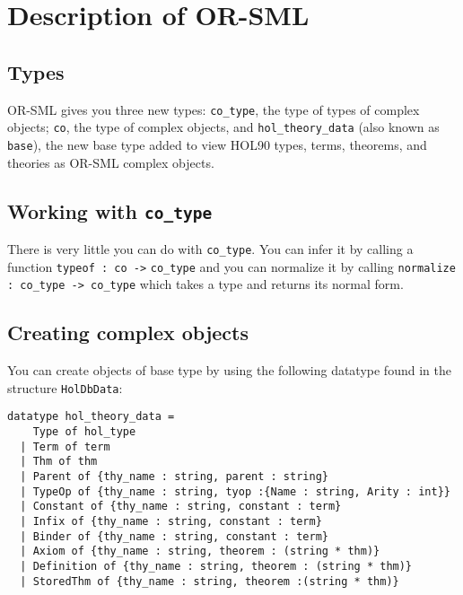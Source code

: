 \section{Description of OR-SML}

\subsection{Types}
OR-SML gives you three new types: {\tt co\_type}, the type of types of
complex objects; {\tt co}, the type of complex objects, and
{\tt hol\_theory\_data} (also known as {\tt base}), the 
new base type added to view HOL90 types, terms, theorems, and theories
as OR-SML complex objects.


\subsection{Working with {\tt co\_type}}

There is very little you can do with {\tt co\_type}. You can infer it by
calling a function {\tt typeof : co ->} {\tt co\_type}
and you can
normalize it by calling {\tt normalize : co\_type -> co\_type} which
takes a type and returns its normal form.



\subsection{Creating complex objects}

You can create objects of base type by using the following datatype
found in the structure {\tt HolDbData}:
\begin{verbatim}
datatype hol_theory_data =
    Type of hol_type
  | Term of term
  | Thm of thm
  | Parent of {thy_name : string, parent : string}
  | TypeOp of {thy_name : string, tyop :{Name : string, Arity : int}}
  | Constant of {thy_name : string, constant : term}
  | Infix of {thy_name : string, constant : term}
  | Binder of {thy_name : string, constant : term}
  | Axiom of {thy_name : string, theorem : (string * thm)}
  | Definition of {thy_name : string, theorem : (string * thm)}
  | StoredThm of {thy_name : string, theorem :(string * thm)}
\end{verbatim}

